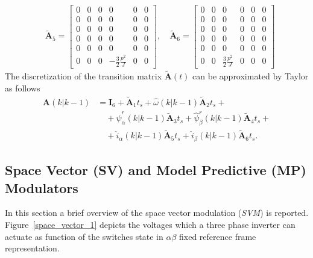 \documentclass[11pt,a4paper]{scrartcl}
\numberwithin{equation}{section}
\theoremstyle{it}
\theoremstyle{definition}
\begin{document}
\begin{onehalfspace}
\begin{equation}
	\begin{aligned}
		&\tilde{\mathbf{A}}_5 = 
		\begin{bmatrix} 
			0 & 0 & 0 & 0 & 0 & 0 \\[6pt]			
			0 & 0 & 0 & 0 & 0 & 0 \\[6pt]
			0 & 0 & 0 & 0 & 0 & 0 \\[6pt]
			0 & 0 & 0 & 0 & 0 & 0 \\[6pt]
			0 & 0 & 0 & 0 & 0 & 0 \\[6pt]
			0 & 0 & 0 & -\frac{3}{2}\frac{p^2}{J} & 0 & 0
		\end{bmatrix},\quad
		\tilde{\mathbf{A}}_6 = 
		\begin{bmatrix} 
			0 & 0 & 0 & 0 & 0 & 0 \\[6pt]			
			0 & 0 & 0 & 0 & 0 & 0 \\[6pt]
			0 & 0 & 0 & 0 & 0 & 0 \\[6pt]
			0 & 0 & 0 & 0 & 0 & 0 \\[6pt]
			0 & 0 & 0 & 0 & 0 & 0 \\[6pt]
			0 & 0 & \frac{3}{2}\frac{p^2}{J} & 0 & 0 & 0
		\end{bmatrix} 
	\end{aligned}
\end{equation} 
The discretization of the transition matrix $\tilde{\mathbf{A}}(t)$ can be 
approximated by Taylor as follows
\begin{equation}\label{}
	\begin{aligned}
		{\mathbf{A}}(k|k-1) &= \mathbf{I}_6 + \tilde{\mathbf{A}}_1t_s + 
		\hat{\omega}(k|k-1) \tilde{\mathbf{A}}_2t_s +\\[8pt]
		&\quad + \hat{\psi}_\alpha^r(k|k-1) \tilde{\mathbf{A}}_3t_s  + \hat{\psi}_\beta^r(k|k-1) \tilde{\mathbf{A}}_4t_s +\\[8pt]
		&\quad + \hat{i}_\alpha(k|k-1) \tilde{\mathbf{A}}_5t_s + \hat{i}_\beta(k|k-1) \tilde{\mathbf{A}}_6t_s.
	\end{aligned}
\end{equation}

\subsection{Space Vector (SV) and Model Predictive (MP) Modulators}	
In this section a brief overview of the space vector modulation (\textit{SVM}) is reported.  Figure~\ref{space_vector_1} depicts the voltages which a three phase inverter can actuate as function of the switches state in $\alpha\beta$ fixed reference frame representation.


\end{onehalfspace}
\end{document}
